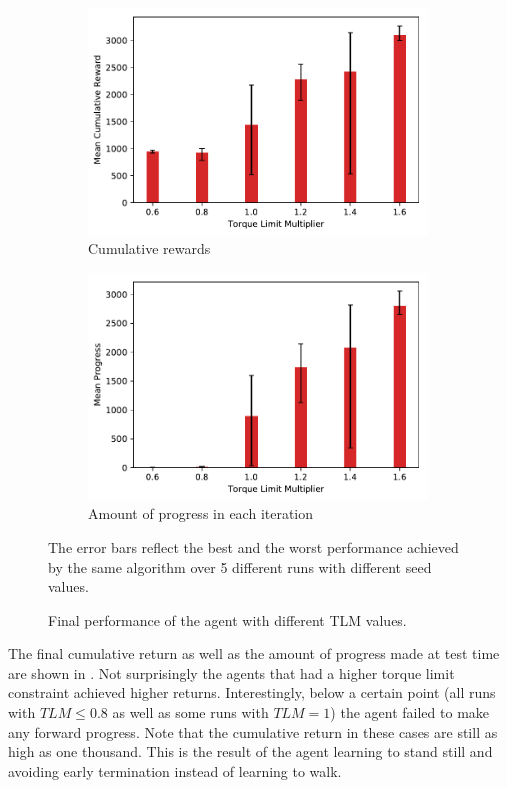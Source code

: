 \begin{figure}
    \centering
    \begin{subfigure}[t]{\textwidth}
        \centering
        \includegraphics[width=90mm]{img/TorqueLimit_Reward.pdf}
        \caption{Cumulative rewards}
    \end{subfigure}
    \begin{subfigure}[t]{\textwidth}
        \centering
        \includegraphics[width=90mm]{img/TorqueLimit_Progress.pdf}
        \caption{Amount of progress in each iteration}
        \label{fig:torque_limit_base_b}
    \end{subfigure}
    \caption{Final performance of the agent with different \ac{TLM} values.}{The error bars reflect the best and the worst performance achieved by the same algorithm over 5 different runs with different seed values.}
    \label{fig:torque_limit_base}
\end{figure}

The final cumulative return as well as the amount of progress made at test time are shown in . Not surprisingly the agents that had a higher torque limit constraint achieved higher returns. Interestingly, below a certain point (all runs with $TLM \leq 0.8$ as well as some runs with $TLM=1$) the agent failed to make any forward progress. Note that the cumulative return in these cases are still as high as one thousand. This is the result of the agent learning to stand still and avoiding early termination instead of learning to walk.

